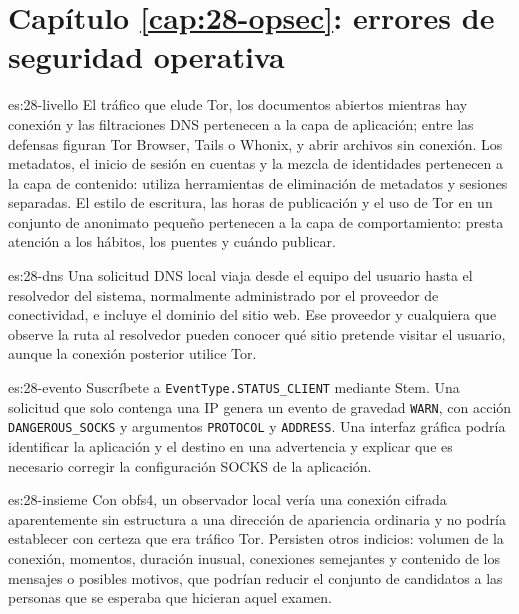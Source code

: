 \section*{Capítulo \ref{cap:28-opsec}: errores de seguridad operativa}

\begin{soluzione}{es:28-livello}
El tráfico que elude Tor, los documentos abiertos mientras hay conexión y las filtraciones DNS pertenecen a la capa de aplicación; entre las defensas figuran Tor Browser, Tails o Whonix,  y abrir archivos sin conexión. Los metadatos, el inicio de sesión en cuentas y la mezcla de identidades pertenecen a la capa de contenido: utiliza herramientas de eliminación de metadatos y sesiones separadas. El estilo de escritura, las horas de publicación y el uso de Tor en un conjunto de anonimato pequeño pertenecen a la capa de comportamiento: presta atención a los hábitos, los puentes y cuándo publicar.
\end{soluzione}

\begin{soluzione}{es:28-dns}
Una solicitud DNS local viaja desde el equipo del usuario hasta el resolvedor del sistema, normalmente administrado por el proveedor de conectividad, e incluye el dominio del sitio web. Ese proveedor y cualquiera que observe la ruta al resolvedor pueden conocer qué sitio pretende visitar el usuario, aunque la conexión posterior utilice Tor.
\end{soluzione}

\begin{soluzione}{es:28-evento}
Suscríbete a \texttt{EventType.STATUS\_CLIENT} mediante Stem. Una solicitud que solo contenga una IP genera un evento de gravedad \texttt{WARN}, con acción \texttt{DANGEROUS\_SOCKS} y argumentos \texttt{PROTOCOL} y \texttt{ADDRESS}. Una interfaz gráfica podría identificar la aplicación y el destino en una advertencia y explicar que es necesario corregir la configuración SOCKS de la aplicación.
\end{soluzione}

\begin{soluzione}{es:28-insieme}
Con obfs4, un observador local vería una conexión cifrada aparentemente sin estructura a una dirección de apariencia ordinaria y no podría establecer con certeza que era tráfico Tor. Persisten otros indicios: volumen de la conexión, momentos, duración inusual, conexiones semejantes y contenido de los mensajes o posibles motivos, que podrían reducir el conjunto de candidatos a las personas que se esperaba que hicieran aquel examen.
\end{soluzione}

